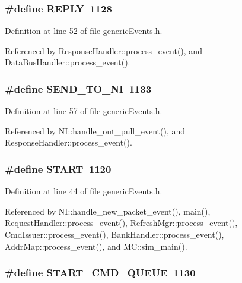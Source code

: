 \subsubsection[{REPLY}]{\setlength{\rightskip}{0pt plus 5cm}\#define REPLY~1128}\label{genericEvents_8h_ad36da46b890d64134f00433d2996425}




Definition at line 52 of file genericEvents.h.

Referenced by ResponseHandler::process\_\-event(), and DataBusHandler::process\_\-event().
\subsubsection[{SEND\_\-TO\_\-NI}]{\setlength{\rightskip}{0pt plus 5cm}\#define SEND\_\-TO\_\-NI~1133}\label{genericEvents_8h_f21ce24b5e646c07bbf9583964eba7f4}




Definition at line 57 of file genericEvents.h.

Referenced by NI::handle\_\-out\_\-pull\_\-event(), and ResponseHandler::process\_\-event().
\subsubsection[{START}]{\setlength{\rightskip}{0pt plus 5cm}\#define START~1120}\label{genericEvents_8h_3018c7600b7bb9866400596a56a57af7}




Definition at line 44 of file genericEvents.h.

Referenced by NI::handle\_\-new\_\-packet\_\-event(), main(), RequestHandler::process\_\-event(), RefreshMgr::process\_\-event(), CmdIssuer::process\_\-event(), BankHandler::process\_\-event(), AddrMap::process\_\-event(), and MC::sim\_\-main().
\subsubsection[{START\_\-CMD\_\-QUEUE}]{\setlength{\rightskip}{0pt plus 5cm}\#define START\_\-CMD\_\-QUEUE~1130}\label{genericEvents_8h_ad317c3796a46bceafded9d5bd7b100c}





